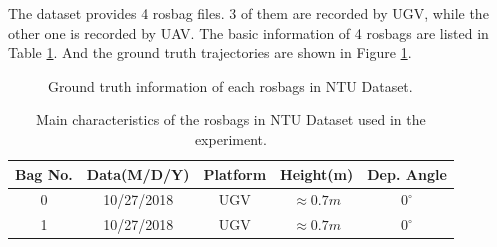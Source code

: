 The dataset provides 4 rosbag files. 3 of them are recorded by UGV, while the other one is recorded by UAV. The basic information of 4 rosbags are listed in Table \ref{tbl:ntubagsinfo}. And the ground truth trajectories are shown in Figure \ref{fig:ntugt}.

\begin{figure}
	\centering
	\caption{Ground truth information of each rosbags in NTU Dataset.}
	\label{fig:ntugt}
\end{figure}

\begin{table}
	\centering
	\caption{Main characteristics of the rosbags in NTU Dataset used in the experiment.}
	\begin{tabular}{|c|c|c|c|c|}
		\hline
		Bag No. & Data(M/D/Y)  & Platform & Height(m) & Dep. Angle  \\
		\hline
		0&10/27/2018& UGV & $\approx 0.7m$ & $0^\circ$ \\
		\hline
		1&10/27/2018& UGV & $\approx 0.7m$ & $0^\circ$ \\
		\hline
	\end{tabular}
	\label{tbl:ntubagsinfo}
\end{table}

